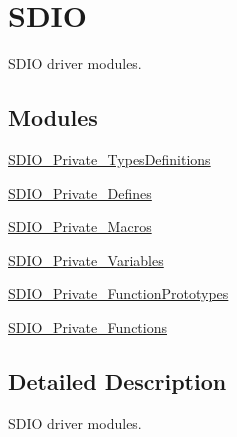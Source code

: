 \hypertarget{group___s_d_i_o}{\section{S\-D\-I\-O}
\label{group___s_d_i_o}
}


S\-D\-I\-O driver modules.  


\subsection*{Modules}
\begin{DoxyCompactItemize}
\item 
\hyperlink{group___s_d_i_o___private___types_definitions}{S\-D\-I\-O\-\_\-\-Private\-\_\-\-Types\-Definitions}
\item 
\hyperlink{group___s_d_i_o___private___defines}{S\-D\-I\-O\-\_\-\-Private\-\_\-\-Defines}
\item 
\hyperlink{group___s_d_i_o___private___macros}{S\-D\-I\-O\-\_\-\-Private\-\_\-\-Macros}
\item 
\hyperlink{group___s_d_i_o___private___variables}{S\-D\-I\-O\-\_\-\-Private\-\_\-\-Variables}
\item 
\hyperlink{group___s_d_i_o___private___function_prototypes}{S\-D\-I\-O\-\_\-\-Private\-\_\-\-Function\-Prototypes}
\item 
\hyperlink{group___s_d_i_o___private___functions}{S\-D\-I\-O\-\_\-\-Private\-\_\-\-Functions}
\end{DoxyCompactItemize}


\subsection{Detailed Description}
S\-D\-I\-O driver modules. 